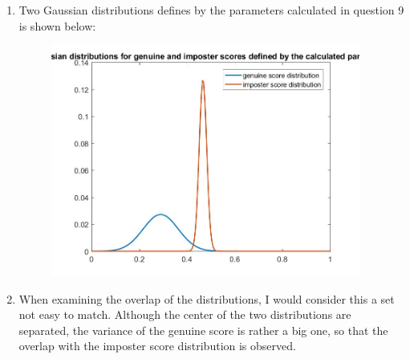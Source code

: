 \documentclass[a4paper]{article}
\begin{document}
\begin{spacing}{2.0}
\begin{enumerate}
	
	\item Two Gaussian distributions defines by the parameters calculated in question 9 is shown below:
	\begin{figure}[H]
	\centering
	\includegraphics[width = 4in]{scoreDis.jpg}
	\end{figure}
	
	\item When examining the overlap of the distributions, I would consider this a set not easy to match. Although the center of the two distributions are separated, the variance of the genuine score is rather a big one, so that the overlap with the imposter score distribution is observed.
	

\end{enumerate}
\end{spacing}
\end{document}
